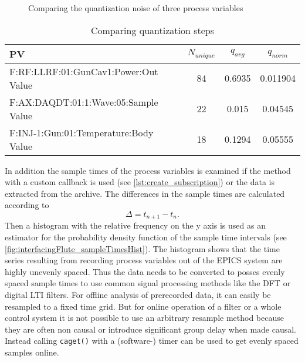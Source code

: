 \begin{figure}[tb]
		\hfill
        
        \hfill
        
        \hfill
       \caption{Comparing the quantization noise of three process variables}
    \label{fig:quantNoise}
\end{figure}

\begin{table}[tb]
\caption{Comparing quantization steps}\label{tab:interfacingFlute_quantSteps}
\centering
\begin{tabular}{lSSS}
\toprule
PV & {$N_{unique}$} & {$q_{avg}$} & {$q_{norm}$}\\
\midrule
F:RF:LLRF:01:GunCav1:Power:Out Value  & 84 & 0.6935 & 0.011904\\
F:AX:DAQDT:01:1:Wave:05:Sample Value  & 22 & 0.015  & 0.04545\\
F:INJ-1:Gun:01:Temperature:Body Value & 18 & 0.1294 & 0.05555\\
\bottomrule
\end{tabular}
\end{table}


In addition the sample times of the process variables is examined if the method with a custom callback is used (see \autoref{lst:create_subscription}) or the data is extracted from the archive. The differences in the sample times are calculated according to
\begin{equation}
\Delta=t_{n+1}-t_n.
\end{equation}
Then a histogram with the relative frequency on the y axis is used as an estimator for the probability density function of the sample time intervals (see \autoref{fig:interfacingFlute_sampleTimesHist}). The histogram shows that the time series resulting from recording process variables out of the EPICS system are highly unevenly spaced. Thus the data needs to be converted to posses evenly spaced sample times to use common signal processing methods like the DFT or digital LTI filters. For offline analysis of prerecorded data, it can easily be resampled to a fixed time grid. But for online operation of a filter or a whole control system it is not possible to use an arbitrary resample method because they are often non causal or introduce significant group delay when made causal. Instead calling \texttt{caget()} with a (software-) timer can be used to get evenly spaced samples online.

